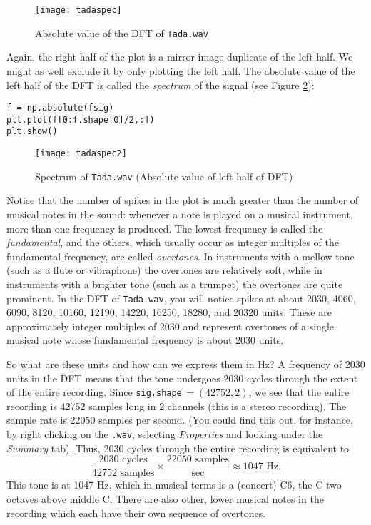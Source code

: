 \begin{figure}[ht]\caption{Absolute value of the DFT of \texttt{Tada.wav}}\label{tadaspec}\centering\texttt{[image: tadaspec]}\end{figure}
Again, the right half of the plot is a mirror-image duplicate of the left half. We might as well exclude it by only plotting the left half. The absolute value of the left half of  the DFT is called the \emph{spectrum} of the signal (see Figure \ref{tadaspec2}):
\begin{lstlisting}
f = np.absolute(fsig)
plt.plot(f[0:f.shape[0]/2,:])
plt.show()
\end{lstlisting}
\begin{figure}[ht]\caption{Spectrum of \texttt{Tada.wav} (Absolute value of left half of DFT)}\label{tadaspec2}\centering\texttt{[image: tadaspec2]}\end{figure}
Notice that the number of spikes in the plot is much greater than the number of musical notes in the sound: whenever a note is played on a musical instrument, more than one frequency is produced. The lowest frequency is called the \emph{fundamental}, and the others, which usually occur as integer multiples of the fundamental frequency, are called \emph{overtones}. In instruments with a mellow tone (such as a flute or vibraphone) the overtones are relatively soft, while in instruments with a brighter tone (such as a trumpet) the overtones are quite prominent. In the DFT of \texttt{Tada.wav}, you will notice spikes at about 2030, 4060, 6090, 8120, 10160, 12190, 14220, 16250, 18280, and 20320 units. These are approximately integer multiples of 2030 and represent overtones of a single musical note whose fundamental frequency is about 2030 units.

So what are these units and how can we express them in Hz? 
A frequency of 2030 units in the DFT means that the tone undergoes 2030 cycles through the extent of the entire recording. 
Since \texttt{sig.shape}$\, = (42752, 2)$, we see that the entire recording is 42752 samples long in 2 channels (this is a stereo recording).
The sample rate is 22050 samples per second. (You could find this out, for instance, by right clicking on the \texttt{.wav}, selecting \emph{Properties} and looking under the \emph{Summary} tab).  Thus, 2030 cycles through the entire recording is equivalent to
$$\frac{2030\text{ cycles}}{42752\text{ samples}} \times \frac{22050\text{ samples}}{\text{sec}} \approx 1047 \text{ Hz}.$$
This tone is at 1047 Hz, which in musical terms is a (concert) C6, the C two octaves above middle C. There are also other, lower musical notes in the recording which each have their own sequence of overtones.

